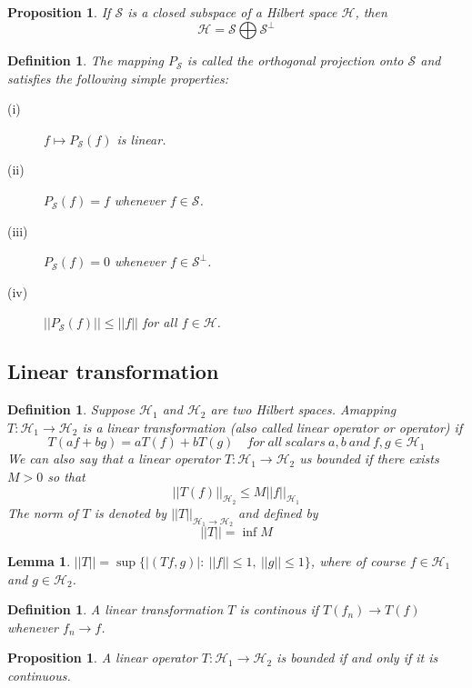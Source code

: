 \documentclass[11pt]{article}
\newtheorem{definition}[theorem]{Definition}
\newtheorem{proposition}[theorem]{Proposition}
\newtheorem{lemma}[theorem]{Lemma}
\begin{document}
\begin{proposition}
    If $\mathcal{S}$ is a closed subspace of a Hilbert space $\mathcal{H}$, then
    \[\mathcal{H}=\mathcal{S}\bigoplus \mathcal{S}^\perp\]
\end{proposition}

\begin{definition}
    The mapping $P_\mathcal{S}$ is called the orthogonal projection onto $\mathcal{S}$ and satisfies the following simple properties:
    \begin{description}
        \item[(i)] $f\mapsto P_\mathcal{S}(f)$ is linear.
        \item[(ii)] $P_\mathcal{S}(f)=f$ whenever $f\in\mathcal{S}$.
        \item[(iii)] $P_\mathcal{S}(f)=0$ whenever $f\in\mathcal{S}^\perp$.
        \item[(iv)] $||P_\mathcal{S}(f)||\leq||f||$ for all $f\in \mathcal{H}$.
    \end{description}
\end{definition}

\subsection{Linear transformation}
\begin{definition}
    Suppose $\mathcal{H}_1$ and $\mathcal{H}_2$ are two Hilbert spaces. Amapping $T:\mathcal{H}_1\to\mathcal{H}_2$ is a linear transformation (also called linear operator or operator) if
    \[T(af+bg)=aT(f)+bT(g)\quad for\ all\ scalars\ a,b\ and\ f,g\in \mathcal{H}_1\]
    We can also say that a linear operator $T:\mathcal{H}_1\to\mathcal{H}_2$ us bounded if there exists $M>0$ so that
    \[||T(f)||_{\mathcal{H}_2}\leq M||f||_{\mathcal{H}_1}\]
    The norm of $T$ is denoted by $||T||_{\mathcal{H}_1\to \mathcal{H}_2}$ and defined by
    \[||T||=\inf M\]
\end{definition}

\begin{lemma}
    $||T||=\sup\{|(Tf,g)|:\ ||f||\leq 1,\ ||g||\leq 1\}$, where of course $f\in \mathcal{H}_1$ and $g\in \mathcal{H}_2$.
\end{lemma}

\begin{definition}
    A linear transformation $T$ is continous if $T(f_n)\to T(f)$ whenever $f_n\to f$.
\end{definition}

\begin{proposition}
    A linear operator $T:\mathcal{H}_1\to\mathcal{H}_2$ is bounded if and only if it is continuous.
\end{proposition}
\end{document}
